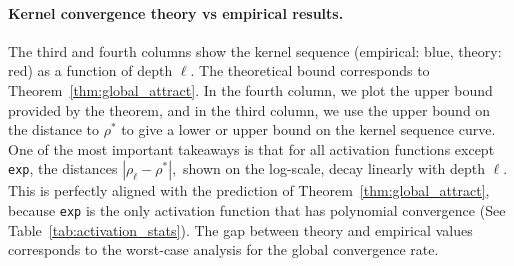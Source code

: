 \documentclass[twoside]{article}
\newcommand{\E}{\mathbb{E}\,}
\newtheorem{remark}{Remark}
\theoremstyle{definition}
\begin{document}
\paragraph{Kernel convergence theory vs empirical results.}
The third and fourth columns show the kernel sequence (empirical: blue, theory: red) as a function of depth $\ell.$  The theoretical bound corresponds to Theorem~\ref{thm:global_attract}. In the fourth column, we plot the upper bound provided by the theorem, and in the third column, we use the upper bound on the distance to $\rho^*$ to give a lower or upper bound on the kernel sequence curve.  One of the most important takeaways is that for all activation functions except \texttt{exp}, the distances $|\rho_\ell-\rho^*|,$ shown on the log-scale, decay linearly with depth $\ell.$ This is perfectly aligned with the prediction of Theorem~\ref{thm:global_attract}, because \texttt{exp} is the only activation function that has polynomial convergence (See Table~\ref{tab:activation_stats}). The gap between theory and empirical values corresponds to the worst-case analysis for the global convergence rate. 


\end{document}
